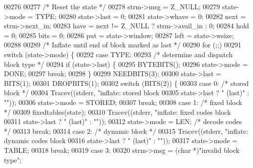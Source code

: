 \begin{DoxyCode}
00276 
00277     \textcolor{comment}{/* Reset the state */}
00278     strm->msg = Z\_NULL;
00279     state->mode = TYPE;
00280     state->last = 0;
00281     state->whave = 0;
00282     next = strm->next\_in;
00283     have = next != Z\_NULL ? strm->avail\_in : 0;
00284     hold = 0;
00285     bits = 0;
00286     put = state->window;
00287     left = state->wsize;
00288 
00289     \textcolor{comment}{/* Inflate until end of block marked as last */}
00290     for (;;)
00291         \textcolor{keywordflow}{switch} (state->mode) \{
00292         \textcolor{keywordflow}{case} TYPE:
00293             \textcolor{comment}{/* determine and dispatch block type */}
00294             \textcolor{keywordflow}{if} (state->last) \{
00295                 BYTEBITS();
00296                 state->mode = DONE;
00297                 \textcolor{keywordflow}{break};
00298             \}
00299             NEEDBITS(3);
00300             state->last = BITS(1);
00301             DROPBITS(1);
00302             \textcolor{keywordflow}{switch} (BITS(2)) \{
00303             \textcolor{keywordflow}{case} 0:                             \textcolor{comment}{/* stored block */}
00304                 Tracev((stderr, \textcolor{stringliteral}{"inflate:     stored block%
00305                         state->last ? \textcolor{stringliteral}{" (last)"} : \textcolor{stringliteral}{""}));
00306                 state->mode = STORED;
00307                 \textcolor{keywordflow}{break};
00308             \textcolor{keywordflow}{case} 1:                             \textcolor{comment}{/* fixed block */}
00309                 fixedtables(state);
00310                 Tracev((stderr, \textcolor{stringliteral}{"inflate:     fixed codes block%
00311                         state->last ? \textcolor{stringliteral}{" (last)"} : \textcolor{stringliteral}{""}));
00312                 state->mode = LEN;              \textcolor{comment}{/* decode codes */}
00313                 \textcolor{keywordflow}{break};
00314             \textcolor{keywordflow}{case} 2:                             \textcolor{comment}{/* dynamic block */}
00315                 Tracev((stderr, \textcolor{stringliteral}{"inflate:     dynamic codes block%
00316                         state->last ? \textcolor{stringliteral}{" (last)"} : \textcolor{stringliteral}{""}));
00317                 state->mode = TABLE;
00318                 \textcolor{keywordflow}{break};
00319             \textcolor{keywordflow}{case} 3:
00320                 strm->msg = (\textcolor{keywordtype}{char} *)\textcolor{stringliteral}{"invalid block type"};
}}}
\end{DoxyCode}
